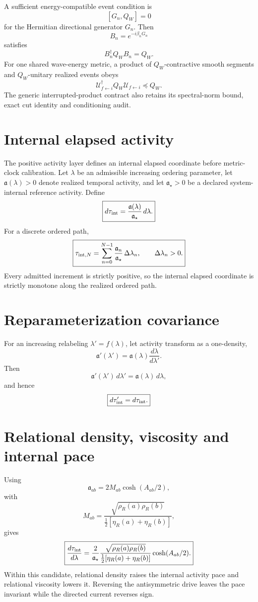 \documentclass[11pt]{book}
\begin{document}
A sufficient energy-compatible event condition is
\[
[G_n,Q_W]=0
\]
for the Hermitian directional generator $G_n$.  Then
\[
B_n=e^{-i\beta_nG_n}
\]
satisfies
\[
B_n^\dagger Q_WB_n=Q_W.
\]
For one shared wave-energy metric, a product of $Q_W$-contractive smooth segments and $Q_W$-unitary realized events obeys
\[
\boxed{
\mathcal U_{f\leftarrow i}^\dagger
Q_W
\mathcal U_{f\leftarrow i}
\preceq Q_W.
}
\]
The generic interrupted-product contract also retains its spectral-norm bound, exact cut identity and conditioning audit.

\section{Internal elapsed activity}

The positive activity layer defines an internal elapsed coordinate before metric-clock calibration. Let $\lambda$ be an admissible increasing ordering parameter, let $\mathfrak a(\lambda)>0$ denote realized temporal activity, and let $\mathfrak a_\star>0$ be a declared system-internal reference activity. Define
\[
\boxed{
d\tau_{\rm int}
=\frac{\mathfrak a(\lambda)}{\mathfrak a_\star}\,d\lambda.
}
\]
For a discrete ordered path,
\[
\boxed{
\tau_{{\rm int},N}
=\sum_{n=0}^{N-1}
\frac{\mathfrak a_n}{\mathfrak a_\star}\,\Delta\lambda_n,
\qquad
\Delta\lambda_n>0.
}
\]
Every admitted increment is strictly positive, so the internal elapsed coordinate is strictly monotone along the realized ordered path.

\section{Reparameterization covariance}

For an increasing relabeling $\lambda'=f(\lambda)$, let activity transform as a one-density,
\[
\mathfrak a'(\lambda')
=\mathfrak a(\lambda)\frac{d\lambda}{d\lambda'}.
\]
Then
\[
\mathfrak a'(\lambda')\,d\lambda'
=\mathfrak a(\lambda)\,d\lambda,
\]
and hence
\[
\boxed{d\tau'_{\rm int}=d\tau_{\rm int}.}
\]

\section{Relational density, viscosity and internal pace}

Using
\[
\mathfrak a_{ab}
=2M_{ab}\cosh(A_{ab}/2),
\]
with
\[
M_{ab}
=\frac{\sqrt{\rho_R(a)\rho_R(b)}}{\tfrac12[\eta_R(a)+\eta_R(b)]},
\]
gives
\[
\boxed{
\frac{d\tau_{\rm int}}{d\lambda}
=\frac{2}{\mathfrak a_\star}
\frac{\sqrt{\rho_R(a)\rho_R(b)}}{\tfrac12[\eta_R(a)+\eta_R(b)]}
\cosh(A_{ab}/2).
}
\]
Within this candidate, relational density raises the internal activity pace and relational viscosity lowers it. Reversing the antisymmetric drive leaves the pace invariant while the directed current reverses sign.
\end{document}
